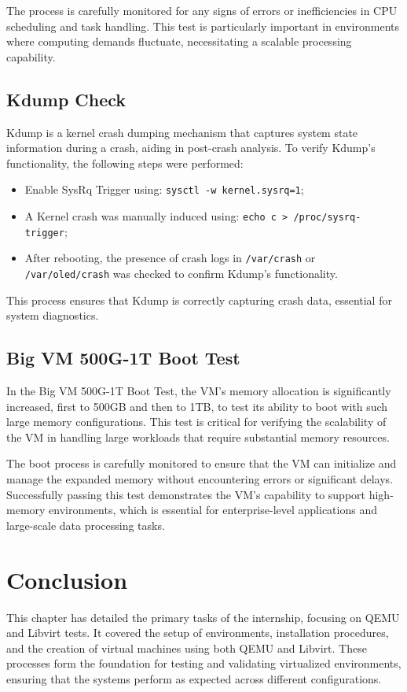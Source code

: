 The process is carefully monitored for any signs of errors or inefficiencies in CPU scheduling and task handling. This test is particularly important in environments where computing demands fluctuate, necessitating a scalable processing capability.

\subsection{Kdump Check}
Kdump is a kernel crash dumping mechanism that captures system state information during a crash, aiding in post-crash analysis. To verify Kdump's functionality, the following steps were performed:

\begin{itemize}
    \item Enable SysRq Trigger using: \texttt{sysctl -w kernel.sysrq=1};
    \item A Kernel crash was manually induced using: \texttt{echo c > /proc/sysrq-trigger};
    \item After rebooting, the presence of crash logs in \texttt{/var/crash} or \texttt{/var/oled/crash} was checked to confirm Kdump's functionality.
\end{itemize}

This process ensures that Kdump is correctly capturing crash data, essential for system diagnostics.

\subsection{Big VM 500G-1T Boot Test}
In the Big VM 500G-1T Boot Test, the VM's memory allocation is significantly increased, first to 500GB and then to 1TB, to test its ability to boot with such large memory configurations. This test is critical for verifying the scalability of the VM in handling large workloads that require substantial memory resources.\mynewline

The boot process is carefully monitored to ensure that the VM can initialize and manage the expanded memory without encountering errors or significant delays. Successfully passing this test demonstrates the VM’s capability to support high-memory environments, which is essential for enterprise-level applications and large-scale data processing tasks.

\section{Conclusion}
This chapter has detailed the primary tasks of the internship, focusing on QEMU and Libvirt tests. It covered the setup of environments, installation procedures, and the creation of virtual machines using both QEMU and Libvirt. These processes form the foundation for testing and validating virtualized environments, ensuring that the systems perform as expected across different configurations.